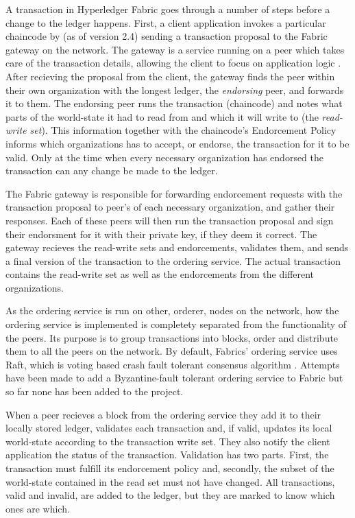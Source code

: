 \documentclass[english, biblatex, digitaloutput]{kththesis}
\begin{document}
A transaction in Hyperledger Fabric goes through a number of steps before a change to the ledger happens. First, a client application invokes a particular chaincode by (as of version 2.4) sending a transaction proposal to the Fabric gateway on the network. The gateway is a service running on a peer which takes care of the transaction details, allowing the client to focus on application logic \cite{fabric_gateway_2022}. After recieving the proposal from the client, the gateway finds the peer within their own organization with the longest ledger, the \textit{endorsing} peer, and forwards it to them. The endorsing peer runs the transaction (\ie chaincode) and notes what parts of the world-state it had to read from and which it will write to (the \textit{read-write set}). This information together with the chaincode's Endorcement Policy informs which organizations has to accept, or endorse, the transaction for it to be valid. Only at the time when every necessary organization has endorsed the transaction can any change be made to the ledger.

The Fabric gateway is responsible for forwarding endorcement requests with the transaction proposal to peer's of each necessary organization, and gather their responses. Each of these peers will then run the transaction proposal and sign their endorsment for it with their private key, if they deem it correct. The  gateway recieves the read-write sets and endorcements, validates them, and sends a final version of the transaction to the ordering service. The actual transaction contains the read-write set as well as the endorcements from the different organizations.

As the ordering service is run on other, orderer, nodes on the network, how the ordering service is implemented is completety separated from the functionality of the peers. Its purpose is to group transactions into blocks, order and distribute them to all the peers on the network. By default, Fabrics' ordering service uses Raft, which is voting based crash fault tolerant consensus algorithm \cite{ongaro_raft_2014}. Attempts have been made to add a Byzantine-fault tolerant ordering service to Fabric \cite{barger_byzantine_2021} but so far none has been added to the project.

When a peer recieves a block from the ordering service they add it to their locally stored ledger, validates each transaction and, if valid, updates its local world-state according to the transaction write set. They also notify the client application the status of the transaction. Validation has two parts. First, the transaction must fulfill its endorcement policy and, secondly, the subset of the world-state contained in the read set must not have changed. All transactions, valid and invalid, are added to the ledger, but they are marked to know which ones are which.
\end{document}
